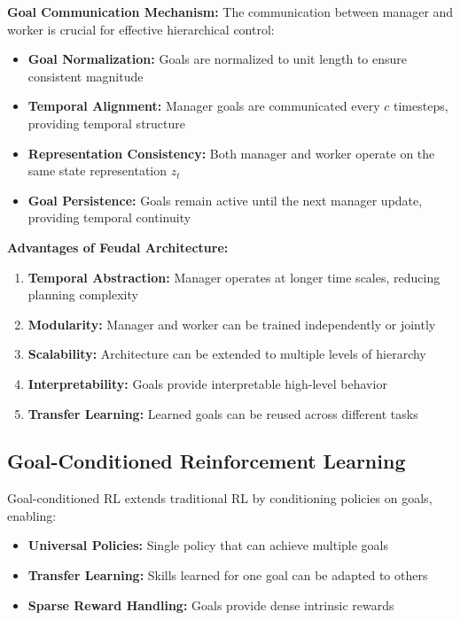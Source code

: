 \documentclass[12pt]{article}
\begin{document}
{{\textbf{Goal Communication Mechanism:}
The communication between manager and worker is crucial for effective hierarchical control:

\begin{itemize}
    \item \textbf{Goal Normalization:} Goals are normalized to unit length to ensure consistent magnitude
    \item \textbf{Temporal Alignment:} Manager goals are communicated every $c$ timesteps, providing temporal structure
    \item \textbf{Representation Consistency:} Both manager and worker operate on the same state representation $z_t$
    \item \textbf{Goal Persistence:} Goals remain active until the next manager update, providing temporal continuity
\end{itemize}

\textbf{Advantages of Feudal Architecture:}
\begin{enumerate}
    \item \textbf{Temporal Abstraction:} Manager operates at longer time scales, reducing planning complexity
    \item \textbf{Modularity:} Manager and worker can be trained independently or jointly
    \item \textbf{Scalability:} Architecture can be extended to multiple levels of hierarchy
    \item \textbf{Interpretability:} Goals provide interpretable high-level behavior
    \item \textbf{Transfer Learning:} Learned goals can be reused across different tasks
\end{enumerate}

\subsection{Goal-Conditioned Reinforcement Learning}

Goal-conditioned RL extends traditional RL by conditioning policies on goals, enabling:
\begin{itemize}
    \item \textbf{Universal Policies:} Single policy that can achieve multiple goals
    \item \textbf{Transfer Learning:} Skills learned for one goal can be adapted to others
    \item \textbf{Sparse Reward Handling:} Goals provide dense intrinsic rewards
\end{itemize}

}}
\end{document}
